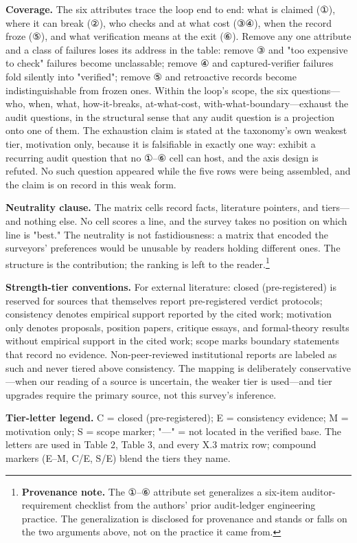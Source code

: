 \documentclass[11pt,a4paper]{article}
\begin{document}
\textbf{Coverage.} The six attributes trace the loop end to end: what is claimed (①), where it can break (②), who checks and at what cost (③④), when the record froze (⑤), and what verification means at the exit (⑥). Remove any one attribute and a class of failures loses its address in the table: remove ③ and "too expensive to check" failures become unclassable; remove ④ and captured-verifier failures fold silently into "verified"; remove ⑤ and retroactive records become indistinguishable from frozen ones. Within the loop's scope, the six questions—who, when, what, how-it-breaks, at-what-cost, with-what-boundary—exhaust the audit questions, in the structural sense that any audit question is a projection onto one of them. The exhaustion claim is stated at the taxonomy's own weakest tier, motivation only, because it is falsifiable in exactly one way: exhibit a recurring audit question that no ①–⑥ cell can host, and the axis design is refuted. No such question appeared while the five rows were being assembled, and the claim is on record in this weak form.

\textbf{Neutrality clause.} The matrix cells record facts, literature pointers, and tiers—and nothing else. No cell scores a line, and the survey takes no position on which line is "best." The neutrality is not fastidiousness: a matrix that encoded the surveyors' preferences would be unusable by readers holding different ones. The structure is the contribution; the ranking is left to the reader.\footnote{\textbf{Provenance note.} The ①–⑥ attribute set generalizes a six-item auditor-requirement checklist from the authors' prior audit-ledger engineering practice. The generalization is disclosed for provenance and stands or falls on the two arguments above, not on the practice it came from.}

\textbf{Strength-tier conventions.} For external literature: closed (pre-registered) is reserved for sources that themselves report pre-registered verdict protocols; consistency denotes empirical support reported by the cited work; motivation only denotes proposals, position papers, critique essays, and formal-theory results without empirical support in the cited work; scope marks boundary statements that record no evidence. Non-peer-reviewed institutional reports are labeled as such and never tiered above consistency. The mapping is deliberately conservative—when our reading of a source is uncertain, the weaker tier is used—and tier upgrades require the primary source, not this survey's inference.

\textbf{Tier-letter legend.} C = closed (pre-registered); E = consistency evidence; M = motivation only; S = scope marker; "—" = not located in the verified base. The letters are used in Table 2, Table 3, and every X.3 matrix row; compound markers (E–M, C/E, S/E) blend the tiers they name.
\end{document}
